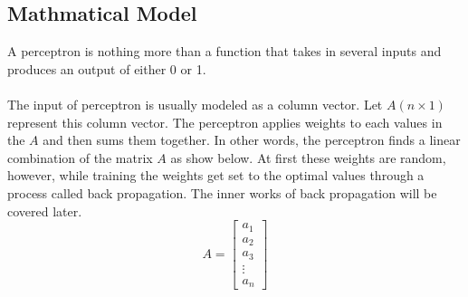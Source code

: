 
\subsection{Mathmatical Model}	
		
A perceptron is nothing more than a function that takes in several inputs and produces an output of either 0 or 1.\\ \\
The input of perceptron is usually modeled as a column vector. Let $A(n\times1)$ represent this column vector. The perceptron applies weights to each values in the $A$ and then sums them together. In other words, the perceptron finds a linear combination of the matrix $A$ as show below. At first these weights are random, however, while training the weights get set to the optimal values through a process called back propagation. The inner works of back propagation will be covered later.
$$
A = 
\begin{bmatrix}
	a_1 \\
	a_2 \\
	a_3 \\
	\vdots \\
	a_n
\end{bmatrix} 
$$
